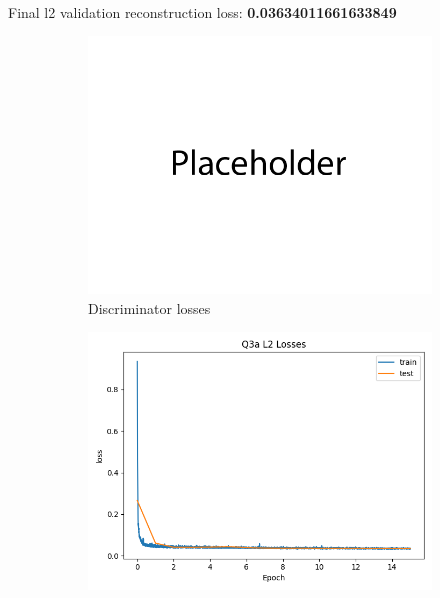 \documentclass{article}
\begin{document}
\newpage
{}\\

Final l2 validation reconstruction loss: \textbf{0.03634011661633849} \\
\begin{figure}[H]
    \centering
    \begin{subfigure}{0.45\textwidth}
        \centering
        \includegraphics[width=\textwidth]{figures/q3a_gan_losses.png}
        \caption{Discriminator losses}
    \end{subfigure}
    \begin{subfigure}{0.45\textwidth}
        \centering
        \includegraphics[width=\textwidth]{figures/q3a_l2_losses.png}

\end{subfigure}
\end{figure}
\end{document}
